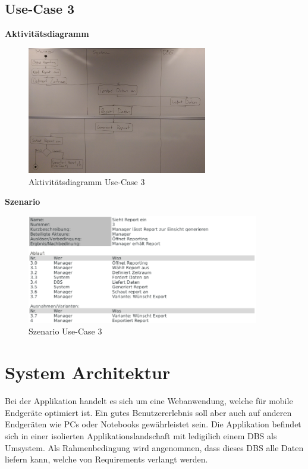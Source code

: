 \documentclass[a4paper]{scrreprt}
\begin{document}
\section{Use-Case 3}

\textbf{Aktivitätsdiagramm}

\begin{figure}[htbp]
\includegraphics[width=0.7\textwidth]{uc-3_Report_einsehen/uc3_activity_diagram.png}
\caption[Aktivitätsdiagramm Use-Case 3]{Aktivitätsdiagramm Use-Case 3}
\end{figure}
\pagebreak

\textbf{Szenario}

\begin{figure}[htbp]
\includegraphics[width=0.9\textwidth]{uc-3_Report_einsehen/uc3_scenario.png}
\caption[Szenario Use-Case 3]{Szenario Use-Case 3}
\end{figure}



\chapter{System Architektur}
Bei der Applikation handelt es sich um eine Webanwendung, welche für mobile Endgeräte optimiert ist. Ein gutes Benutzererlebnis soll aber auch auf anderen Endgeräten wie PCs oder Notebooks gewährleistet sein. Die Applikation befindet sich in einer isolierten Applikationslandschaft mit ledigilich einem DBS als Umsystem. Als Rahmenbedingung wird angenommen, dass dieses DBS alle Daten liefern kann, welche von Requirements verlangt werden.
\end{document}
